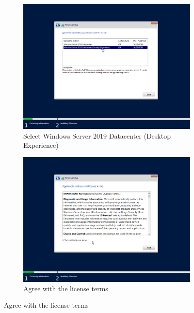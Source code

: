 \begin{figure}[!htb]\ContinuedFloat
	\begin{subfigure}{0.5\textwidth}
		\captionsetup{width=0.8\linewidth}
		\includegraphics[width=0.9\linewidth]{img/Methodologie/Migration6.png}
		\centering
		\caption{Select Windows Server 2019 Datacenter (Desktop Experience)}
	\end{subfigure}
	\begin{subfigure}{0.5\textwidth}
		\captionsetup{width=0.8\linewidth}
		\includegraphics[width=0.9\linewidth]{img/Methodologie/Migration7.png} 
		\centering
		\caption{Agree with the license terms}
	\end{subfigure}
\end{figure}
